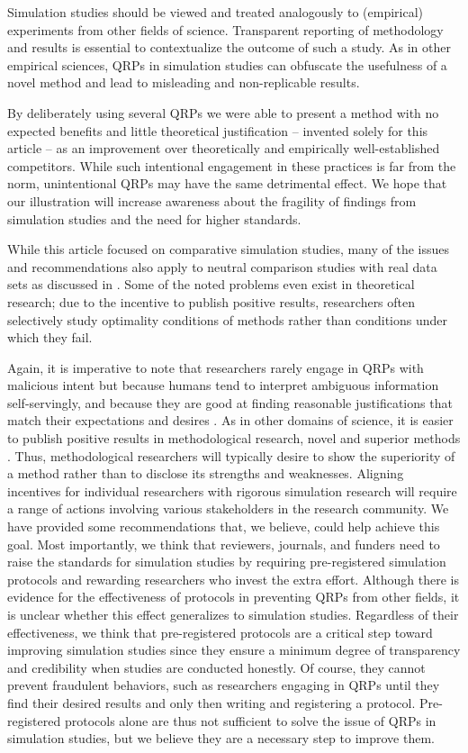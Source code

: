 \documentclass[a4paper, 11pt]{article}
\begin{document}
Simulation studies should be viewed and treated analogously to (empirical)
experiments from other fields of science. Transparent reporting of methodology
and results is essential to contextualize the outcome of such a study. As in
other empirical sciences, QRPs in simulation studies can obfuscate the usefulness
of a novel method and lead to misleading and non-replicable results.

By deliberately using several QRPs we were able to present a method with no expected 
benefits and little theoretical justification -- invented solely for this article -- as an
improvement over theoretically and empirically well-established competitors.
While such intentional engagement in these practices is far from the norm,
unintentional QRPs may have the same detrimental effect.
We hope that our illustration will increase awareness about the fragility of
findings from simulation studies and the need for higher standards.

While this article focused on comparative simulation studies, many of the issues
and recommendations also apply to neutral comparison studies with real data sets 
as discussed in \citet{Niessl2021}. Some of the noted problems even exist in 
theoretical research; due to the incentive to publish positive results, researchers
often selectively study optimality conditions of methods rather than conditions 
under which they fail.

Again, it is imperative to note that researchers rarely engage in QRPs with malicious 
intent but because humans tend to interpret ambiguous information self-servingly, and 
because they are good at finding reasonable justifications that match their expectations 
and desires \citep{Simmons2011}. As in other domains of science, it is easier to publish 
positive results in methodological research, \ie{} novel and superior methods
\citep{Boulesteix2015}. Thus, methodological 
researchers will typically desire to show the superiority of a method rather than 
to disclose its strengths and weaknesses. Aligning incentives for
individual researchers with rigorous simulation research will require a range of
actions involving various stakeholders in the research community. 
We have provided some recommendations that, we believe, could help achieve this goal.
Most importantly, we think that reviewers, journals, and funders need to raise 
the standards for simulation studies by requiring pre-registered simulation protocols
and rewarding researchers who invest the extra effort. 
Although there is evidence for the effectiveness of protocols in 
preventing QRPs from other fields, it is unclear whether this effect 
generalizes to simulation studies. 
Regardless of their effectiveness, we think that 
pre-registered protocols
are a critical step toward improving simulation studies since they
ensure a minimum degree of transparency and credibility when studies
are conducted honestly. Of course, they cannot prevent fraudulent 
behaviors, such as researchers engaging in QRPs until they find their desired
results and only then writing and registering a protocol. 
Pre-registered protocols alone are thus not sufficient to solve the 
issue of QRPs in simulation studies, but we believe they are a 
necessary step to improve them.
\end{document}
